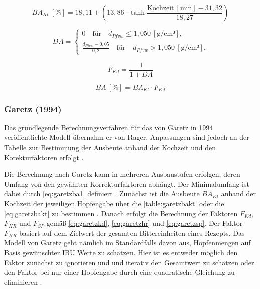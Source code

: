 \documentclass[a4paper,parskip=half]{scrartcl}
\newcommand{\BA}{\mathit{BA}}
\newcommand{\BAKt}{{\mathit{BA}}_{\mathit{Kt}}}
\newcommand{\umin}{\:[\textrm{min}]}
\newcommand{\uden}{\:[\text{g/cm³}]}
\newcommand{\uper}{\:[\text{\%}]}
\newcommand{\FKd}{F_{\mathit{Kd}}}
\newcommand{\FHR}{F_{\mathit{HR}}}
\newcommand{\FSP}{F_{\mathit{SP}}}
\begin{document}
\begin{equation}
\BAKt \uper = 18,11 + \left(13,86 \cdot \tanh{\frac{\text{Kochzeit} \umin - 31,32}{18,27}}\right)
\label{eq:ragerbakt}
\end{equation}


\begin{equation}
\mathit{DA} = \begin{cases}
0 \quad \text{für} \quad d_{\mathit{Pfvw}} \le 1,050 \uden, \\
\frac{d_{\mathit{Pfvw}} - 0,05}{0,2} \quad \text{für} \quad d_{\mathit{Pfvw}} > 1,050 \uden.
\end{cases}
\label{eq:ragerga}
\end{equation}

\begin{equation}
\FKd = \frac{1}{1 + \mathit{DA}}
\label{eq:ragerfkd}
\end{equation}


\begin{equation}
\BA \uper = \BAKt \cdot \FKd
\label{eq:ragerba}
\end{equation}

\subsubsection*{Garetz (1994)}

Das grundlegende Berechnungsverfahren für das von Garetz in 1994
veröffentlichte Modell übernahm er von Rager. Anpassungen sind jedoch an
der Tabelle zur Bestimmung der Ausbeute anhand der Kochzeit und den
Korekturfaktoren erfolgt \parencite[134-144]{Garetz1994}.

Die Berechnung nach Garetz kann in mehreren Ausbaustufen erfolgen,
deren Umfang von den gewählten Korrekturfaktoren abhängt.
Der Minimalumfang ist dabei durch \autoref{eq:garetzba1} definiert
\parencite[137]{Garetz1994}.
Zunächst ist die Ausbeute $\BAKt$ anhand der Kochzeit der jeweiligen 
Hopfengabe über die \autoref{table:garetzbakt} oder die \autoref{eq:garetzbakt} zu bestimmen \parencite{Steinmeyer2021}. Danach erfolgt die
Berechnung der Faktoren $\FKd$, $\FHR$ und $\FSP$ gemäß
\autoref{eq:garetzkd}, \autoref{eq:garetzhr} und \autoref{eq:garetzsp}.
Der Faktor $\FHR$ basiert auf dem Zielwert der gesamten Bittereinheiten
eines Rezepts. Das Modell von Garetz geht nämlich im Standardfalls
davon aus, Hopfenmengen auf Basis gewünschter IBU Werte zu schätzen.
Hier ist es entweder möglich den Faktor zunächst zu ignorieren und
und iterativ den Gesamtwert zu schätzen oder den Faktor bei nur
einer Hopfengabe durch eine quadratische Gleichung zu eliminieren      \parencite[63]{Hall1997}.
\end{document}
